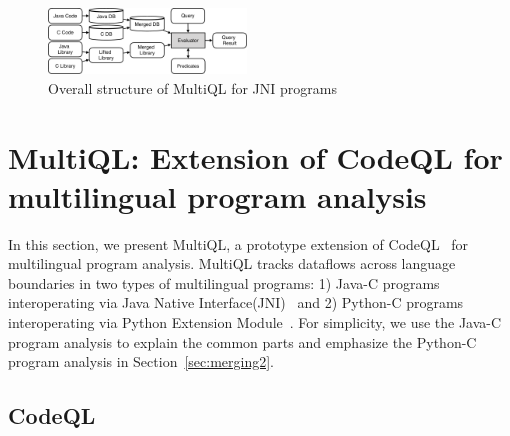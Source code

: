 \begin{figure}[t]
  \centering
  \vspace{2mm}
  \includegraphics[width=0.47\textwidth]{img/codeql.pdf}
  \caption{Overall structure of MultiQL for JNI programs}
  \label{fig:codeql}
\end{figure}

\section{MultiQL: Extension of CodeQL for multilingual program analysis}\label{sec:impl}
In this section, we present MultiQL, a prototype extension of
CodeQL~\cite{codeql} for multilingual program analysis.  MultiQL tracks
dataflows across language boundaries in two types of multilingual programs:
1) Java-C programs interoperating via Java Native Interface(JNI)~\cite{jnispec} and
2) Python-C programs interoperating via Python Extension Module~\cite{pyext}.
For simplicity, we use the Java-C program analysis to explain the common
parts and emphasize the Python-C program analysis in Section~\ref{sec:merging2}.




\subsection{CodeQL}

